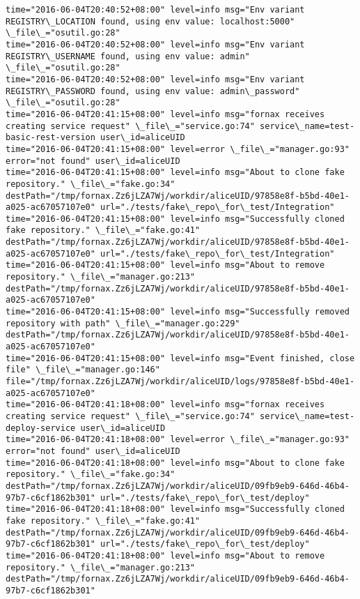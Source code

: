 \begin{lstlisting}[caption={Fornax功能性测试日志}]
time="2016-06-04T20:40:52+08:00" level=info msg="Env variant REGISTRY\_LOCATION found, using env value: localhost:5000" \_file\_="osutil.go:28" 
time="2016-06-04T20:40:52+08:00" level=info msg="Env variant REGISTRY\_USERNAME found, using env value: admin" \_file\_="osutil.go:28" 
time="2016-06-04T20:40:52+08:00" level=info msg="Env variant REGISTRY\_PASSWORD found, using env value: admin\_password" \_file\_="osutil.go:28" 
time="2016-06-04T20:41:15+08:00" level=info msg="fornax receives creating service request" \_file\_="service.go:74" service\_name=test-basic-rest-version user\_id=aliceUID 
time="2016-06-04T20:41:15+08:00" level=error \_file\_="manager.go:93" error="not found" user\_id=aliceUID 
time="2016-06-04T20:41:15+08:00" level=info msg="About to clone fake repository." \_file\_="fake.go:34" destPath="/tmp/fornax.Zz6jLZA7Wj/workdir/aliceUID/97858e8f-b5bd-40e1-a025-ac67057107e0" url="./tests/fake\_repo\_for\_test/Integration" 
time="2016-06-04T20:41:15+08:00" level=info msg="Successfully cloned fake repository." \_file\_="fake.go:41" destPath="/tmp/fornax.Zz6jLZA7Wj/workdir/aliceUID/97858e8f-b5bd-40e1-a025-ac67057107e0" url="./tests/fake\_repo\_for\_test/Integration" 
time="2016-06-04T20:41:15+08:00" level=info msg="About to remove repository." \_file\_="manager.go:213" destPath="/tmp/fornax.Zz6jLZA7Wj/workdir/aliceUID/97858e8f-b5bd-40e1-a025-ac67057107e0" 
time="2016-06-04T20:41:15+08:00" level=info msg="Successfully removed repository with path" \_file\_="manager.go:229" destPath="/tmp/fornax.Zz6jLZA7Wj/workdir/aliceUID/97858e8f-b5bd-40e1-a025-ac67057107e0" 
time="2016-06-04T20:41:15+08:00" level=info msg="Event finished, close file" \_file\_="manager.go:146" file="/tmp/fornax.Zz6jLZA7Wj/workdir/aliceUID/logs/97858e8f-b5bd-40e1-a025-ac67057107e0" 
time="2016-06-04T20:41:18+08:00" level=info msg="fornax receives creating service request" \_file\_="service.go:74" service\_name=test-deploy-service user\_id=aliceUID 
time="2016-06-04T20:41:18+08:00" level=error \_file\_="manager.go:93" error="not found" user\_id=aliceUID 
time="2016-06-04T20:41:18+08:00" level=info msg="About to clone fake repository." \_file\_="fake.go:34" destPath="/tmp/fornax.Zz6jLZA7Wj/workdir/aliceUID/09fb9eb9-646d-46b4-97b7-c6cf1862b301" url="./tests/fake\_repo\_for\_test/deploy" 
time="2016-06-04T20:41:18+08:00" level=info msg="Successfully cloned fake repository." \_file\_="fake.go:41" destPath="/tmp/fornax.Zz6jLZA7Wj/workdir/aliceUID/09fb9eb9-646d-46b4-97b7-c6cf1862b301" url="./tests/fake\_repo\_for\_test/deploy" 
time="2016-06-04T20:41:18+08:00" level=info msg="About to remove repository." \_file\_="manager.go:213" destPath="/tmp/fornax.Zz6jLZA7Wj/workdir/aliceUID/09fb9eb9-646d-46b4-97b7-c6cf1862b301" 

\end{lstlisting}
